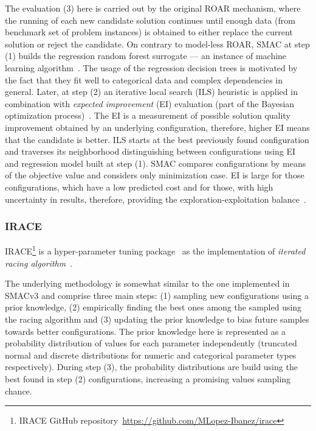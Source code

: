 The evaluation (3) here is carried out by the original ROAR mechanism, where the running of each new candidate solution continues until enough data (from benchmark set of problem instances) is obtained to either replace the current solution or reject the candidate. On contrary to model-less ROAR, SMAC at step (1) builds the regression random forest surrogate — an instance of machine learning algorithm~\cite{breiman2001random}. The usage of the regression decision trees is motivated by the fact that they fit well to categorical data and complex dependencies in general. Later, at step (2) an iterative local search (ILS) heuristic is applied in combination with \emph{expected improvement} (EI) evaluation (part of the Bayesian optimization process)~\cite{shahriari2015taking}. The EI is a measurement of possible solution quality improvement obtained by an underlying configuration, therefore, higher EI means that the candidate is better. ILS starts at the best previously found configuration and traverses its neighborhood distinguishing between configurations using EI and regression model built at step (1). SMAC compares configurations by means of the objective value and considers only minimization case. EI is large for those configurations, which have a low predicted cost and for those, with high uncertainty in results, therefore, providing the exploration-exploitation balance~\cite{jones1998efficient}.


\subsubsection{IRACE}\label{bg: irace}
IRACE\footnote{IRACE GitHub repository~\url{https://github.com/MLopez-Ibanez/irace}} is a hyper-parameter tuning package~\cite{lopez2016irace} as the implementation of \emph{iterated racing algorithm}~\cite{birattari2010f}.

The underlying methodology is somewhat similar to the one implemented in SMACv3 and comprise three main steps: (1) sampling new configurations using a prior knowledge, (2) empirically finding the best ones among the sampled using the racing algorithm and (3) updating the prior knowledge to bias future samples towards better configurations. The prior knowledge here is represented as a probability distribution of values for each parameter independently (truncated normal and discrete distributions for numeric and categorical parameter types respectively). During step (3), the probability distributions are build using the best found in step (2) configurations, increasing a promising values sampling chance.


